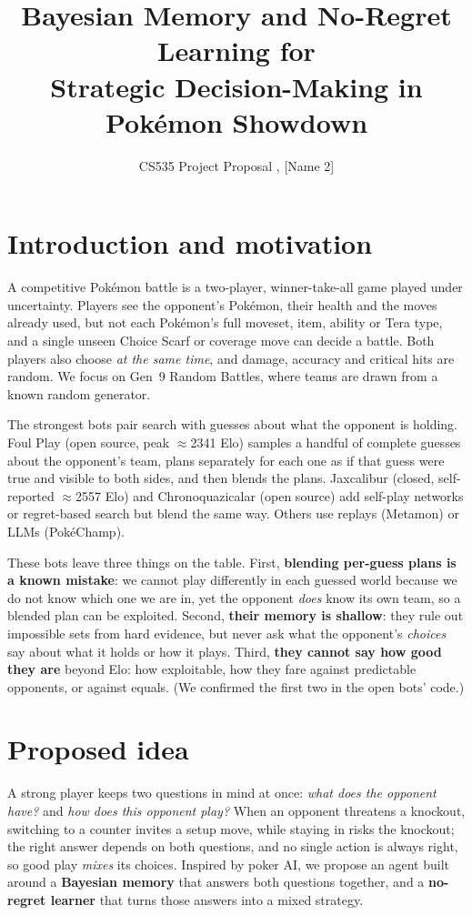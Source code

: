\documentclass[10pt]{article}
\title{\vspace{-2.4em}\textbf{Bayesian Memory and No-Regret Learning for\\Strategic Decision-Making in Pok\'emon Showdown}\vspace{-0.8em}}
\author{CS535 Project Proposal \quad [Name 1], [Name 2]}
\date{\vspace{-1.6em}}
\begin{document}
\maketitle

\section{Introduction and motivation}
A competitive Pok\'emon battle is a two-player, winner-take-all game played under uncertainty. Players see the opponent's Pok\'emon, their health and the moves already used, but not each Pok\'emon's full moveset, item, ability or Tera type, and a single unseen Choice Scarf or coverage move can decide a battle. Both players also choose \emph{at the same time}, and damage, accuracy and critical hits are random. We focus on Gen~9 Random Battles, where teams are drawn from a known random generator.

The strongest bots pair search with guesses about what the opponent is holding. Foul Play (open source, peak $\approx$2341 Elo) samples a handful of complete guesses about the opponent's team, plans separately for each one as if that guess were true and visible to both sides, and then blends the plans. Jaxcalibur (closed, self-reported $\approx$2557 Elo) and Chronoquazicalar (open source) add self-play networks or regret-based search but blend the same way. Others use replays (Metamon) or LLMs (Pok\'eChamp).

These bots leave three things on the table. First, \textbf{blending per-guess plans is a known mistake}: we cannot play differently in each guessed world because we do not know which one we are in, yet the opponent \emph{does} know its own team, so a blended plan can be exploited. Second, \textbf{their memory is shallow}: they rule out impossible sets from hard evidence, but never ask what the opponent's \emph{choices} say about what it holds or how it plays. Third, \textbf{they cannot say how good they are} beyond Elo: how exploitable, how they fare against predictable opponents, or against equals. (We confirmed the first two in the open bots' code.)

\section{Proposed idea}
A strong player keeps two questions in mind at once: \emph{what does the opponent have?} and \emph{how does this opponent play?} When an opponent threatens a knockout, switching to a counter invites a setup move, while staying in risks the knockout; the right answer depends on both questions, and no single action is always right, so good play \emph{mixes} its choices. Inspired by poker AI, we propose an agent built around a \textbf{Bayesian memory} that answers both questions together, and a \textbf{no-regret learner} that turns those answers into a mixed strategy.
\end{document}
